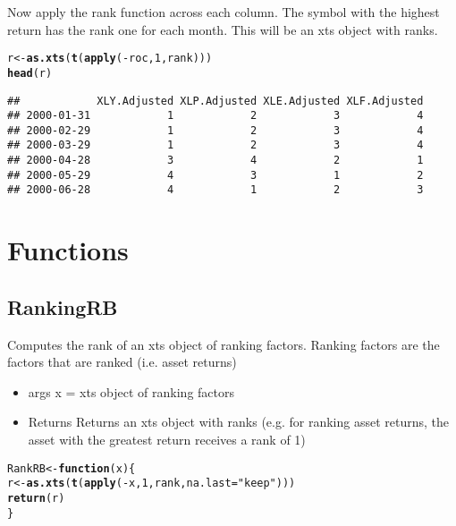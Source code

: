 \documentclass{article}\usepackage{graphicx, color}
\makeatletter
\newcommand{\hlfunctioncall}[1]{\textcolor[rgb]{0.501960784313725,0,0.329411764705882}{\textbf{#1}}}%
\newcommand{\hlstring}[1]{\textcolor[rgb]{0.6,0.6,1}{#1}}%
\newenvironment{kframe}{%
 \def\at@end@of@kframe{}%
 \ifinner\ifhmode%
  \def\at@end@of@kframe{\end{minipage}}%
  \begin{minipage}{\columnwidth}%
 \fi\fi%
 \def\FrameCommand##1{\hskip\@totalleftmargin \hskip-\fboxsep
 \colorbox{shadecolor}{##1}\hskip-\fboxsep
     \hskip-\linewidth \hskip-\@totalleftmargin \hskip\columnwidth}%
 \MakeFramed {\advance\hsize-\width
   \@totalleftmargin\z@ \linewidth\hsize
   \@setminipage}}%
 {\par\unskip\endMakeFramed%
 \at@end@of@kframe}
\newenvironment{knitrout}{}{} %
\makeatother
\begin{document}
Now apply the rank function across each column. The symbol with the highest return has the rank one for each month. This will be an xts object with ranks. 
\begin{knitrout}
\color{fgcolor}\begin{kframe}
\begin{alltt}
r <- \hlfunctioncall{as.xts}(\hlfunctioncall{t}(\hlfunctioncall{apply}(-roc, 1, rank)))
\hlfunctioncall{head}(r)
\end{alltt}
\begin{verbatim}
##            XLY.Adjusted XLP.Adjusted XLE.Adjusted XLF.Adjusted
## 2000-01-31            1            2            3            4
## 2000-02-29            1            2            3            4
## 2000-03-29            1            2            3            4
## 2000-04-28            3            4            2            1
## 2000-05-29            4            3            1            2
## 2000-06-28            4            1            2            3
\end{verbatim}
\end{kframe}
\end{knitrout}

\section{Functions}
\subsection{RankingRB}
Computes the rank of an xts object of ranking factors.  Ranking factors are the factors that are ranked (i.e. asset returns)
\begin{itemize}
\item{args}
  x = xts object of ranking factors
  
\item{Returns}
  Returns an xts object with ranks
  (e.g. for ranking asset returns, the asset with the greatest return
  receives a  rank of 1)
\end{itemize}
\begin{knitrout}
\color{fgcolor}\begin{kframe}
\begin{alltt}
RankRB <- \hlfunctioncall{function}(x) \{
    r <- \hlfunctioncall{as.xts}(\hlfunctioncall{t}(\hlfunctioncall{apply}(-x, 1, rank, na.last = \hlstring{"keep"})))
    \hlfunctioncall{return}(r)
\}
\end{alltt}
\end{kframe}
\end{knitrout}
\end{document}
